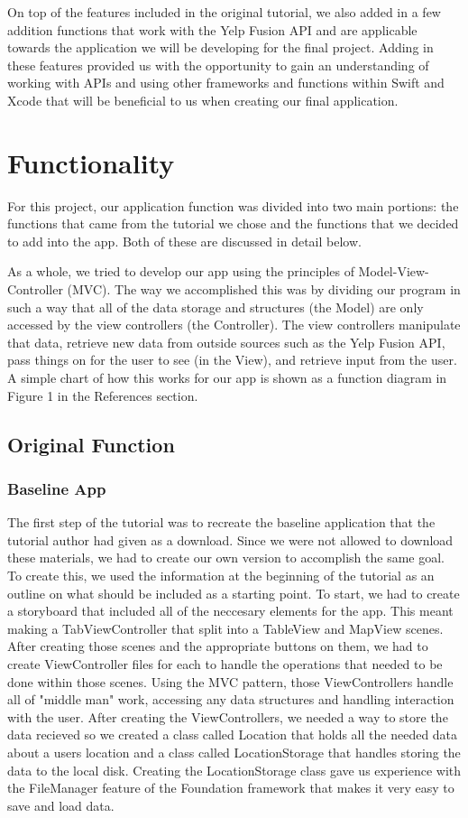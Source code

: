 \documentclass[conference]{IEEEtran}
\begin{document}
On top of the features included in the original tutorial, we also added in a few 
addition functions that work with the Yelp Fusion API and are applicable towards 
the application we will be developing for the final project. Adding in these features
provided us with the opportunity to gain an understanding of working with APIs and
using other frameworks and functions within Swift and Xcode that will be beneficial
to us when creating our final application.

\section{Functionality}
For this project, our application function was divided into two main portions:
the functions that came from the tutorial we chose and the functions that we decided
to add into the app. Both of these are discussed in detail below.

As a whole, we tried to develop our app using the principles of Model-View-Controller 
(MVC). The way we accomplished this was by dividing our program in such a way that 
all of the data storage and structures (the Model) are only accessed by the view
controllers (the Controller). The view controllers manipulate that data, 
retrieve new data from outside sources such as the Yelp Fusion API, pass things on
for the user to see (in the View), and retrieve input from the user. A simple
chart of how this works for our app is shown as a function diagram in Figure 1
in the References section.

\subsection{Original Function}

\subsubsection{Baseline App}
The first step of the tutorial was to recreate the baseline application that the
tutorial author had given as a download. Since we were not allowed to download
these materials, we had to create our own version to accomplish the same goal.
To create this, we used the information at the beginning of the tutorial as an
outline on what should be included as a starting point. To start, we had to create
a storyboard that included all of the neccesary elements for the app. This meant 
making a TabViewController that split into a TableView and MapView scenes. After 
creating those scenes and the appropriate buttons on them, we had to create 
ViewController files for each to handle the operations that needed to be done within
those scenes. Using the MVC pattern, those ViewControllers handle all of "middle man"
work, accessing any data structures and handling interaction with the user. After
creating the ViewControllers, we needed a way to store the data recieved so we created
a class called Location that holds all the needed data about a users location and
a class called LocationStorage that handles storing the data to the local disk.
Creating the LocationStorage class gave us experience with the FileManager feature
of the Foundation framework that makes it very easy to save and load data.
\end{document}
